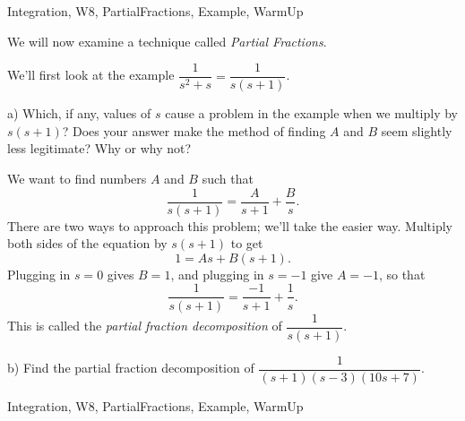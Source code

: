 \begin{tagblock}{Integration, W8, PartialFractions, Example, WarmUp}
\begin{question}
We will now examine a technique called \textit{Partial Fractions}.

\bigskip

We'll first look at the example $\dfrac 1 {s^2+s}=\dfrac 1 {s (s+1)}$. 

\bigskip

a) Which, if any, values of $s$ cause a problem in the example when we multiply by $s(s+1)$? Does your answer make the method of finding $A$ and $B$ seem slightly less legitimate? Why or why not?

\bigskip

We want to find numbers $A$ and $B$ such that 
\begin{equation}\label{partial}
\frac 1 {s(s+1)}=\frac A {s+1}+\frac B s.
\end{equation}
There are two ways to approach this problem; we'll take the easier way. Multiply both sides of the equation by $s(s+1)$ to get
\begin{equation}\label{partial2}
1=As+B(s+1).
\end{equation}
Plugging in $s=0$ gives $B=1$, and plugging in $s=-1$ give $A=-1$, so that 
\[
\frac 1 {s(s+1)}=\frac {-1} {s+1}+\frac 1 s.
\]
\bigskip
This is called the \textit{partial fraction decomposition} of $\dfrac 1 {s(s+1)}$.

\bigskip


b) Find the partial fraction decomposition of $\dfrac 1 {(s+1)(s-3)(10s+7)}$.
	
	
\begin{tags}
	   Integration, W8, PartialFractions, Example, WarmUp
\end{tags}
	
\begin{diary}
	   
\end{diary}
	
\begin{solution}
	   
	    \end{enumerate}
\end{solution}
	
\end{question}

\end{tagblock}

